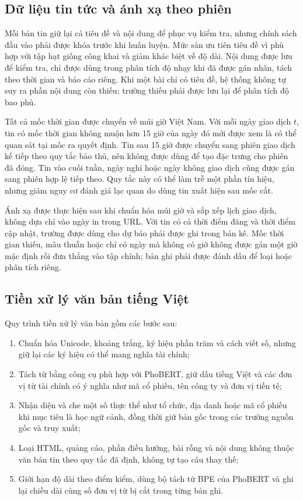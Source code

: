 \subsection{Dữ liệu tin tức và ánh xạ theo phiên}

Mỗi bản tin giữ lại cả tiêu đề và nội dung để phục vụ kiểm tra, nhưng chính sách đầu
vào phải được khóa trước khi huấn luyện. Mức sàn ưu tiên tiêu đề vì phù hợp với tập
hạt giống công khai và giảm khác biệt về độ dài. Nội dung được lưu để kiểm tra, chỉ
được dùng trong phân tích độ nhạy khi đã được gán nhãn, tách theo thời gian và báo cáo
riêng. Khi một bài chỉ có tiêu đề, hệ thống không tự suy ra phần nội dung còn thiếu;
trường thiếu phải được lưu lại để phân tích độ bao phủ.

Tất cả mốc thời gian được chuyển về múi giờ Việt Nam. Với mỗi ngày giao dịch $t$, tin có
mốc thời gian không muộn hơn 15 giờ của ngày đó mới được xem là có thể quan sát tại mốc ra
quyết định. Tin sau 15 giờ được chuyển sang phiên giao dịch kế tiếp theo quy tắc bảo
thủ, nên không được dùng để tạo đặc trưng cho phiên đã đóng. Tin vào cuối tuần, ngày
nghỉ hoặc ngày không giao dịch cũng được gán sang phiên hợp lệ tiếp theo. Quy tắc này
có thể làm trễ một phần tín hiệu, nhưng giảm nguy cơ đánh giá lạc quan do dùng tin xuất
hiện sau mốc cắt.

Ánh xạ được thực hiện sau khi chuẩn hóa múi giờ và sắp xếp lịch giao dịch, không dựa
chỉ vào ngày in trong URL. Với tin có cả thời điểm đăng và thời điểm cập nhật, trường
được dùng cho dự báo phải được ghi trong bản kê. Mốc thời gian thiếu, mâu thuẫn hoặc
chỉ có ngày mà không có giờ không được gán một giờ mặc định rồi đưa thẳng vào tập
chính; bản ghi phải được đánh dấu để loại hoặc phân tích riêng.

\subsection{Tiền xử lý văn bản tiếng Việt}

Quy trình tiền xử lý văn bản gồm các bước sau:

\begin{enumerate}[nosep]
  \item Chuẩn hóa Unicode, khoảng trắng, ký hiệu phần trăm và cách viết số, nhưng giữ
    lại các ký hiệu có thể mang nghĩa tài chính;
  \item Tách từ bằng công cụ phù hợp với PhoBERT, giữ dấu tiếng Việt và các đơn vị từ tài
    chính có ý nghĩa như mã cổ phiếu, tên công ty và đơn vị tiền tệ;
  \item Nhận diện và che một số thực thể như tổ chức, địa danh hoặc mã cổ phiếu khi
    mục tiêu là học ngữ cảnh, đồng thời giữ bản gốc trong các trường nguồn gốc và
    truy xuất;
  \item Loại HTML, quảng cáo, phần điều hướng, bài rỗng và nội dung không thuộc văn bản
    tin theo quy tắc đã định, không tự tạo câu thay thế;
  \item Giới hạn độ dài theo điểm kiểm, dùng bộ tách từ BPE của PhoBERT và ghi lại
    chiều dài cùng số đơn vị từ bị cắt trong từng bản ghi.
\end{enumerate}

